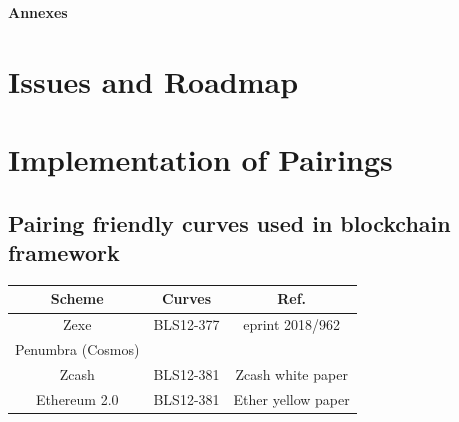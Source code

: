 \documentclass[11pt]{llncs2e/llncs}
\begin{document}
 
 
 
\appendix
\newpage
{\noindent\huge{\bf Annexes}}

\section{Issues and Roadmap}
 
 

\section{Implementation of Pairings}



\subsection{Pairing friendly curves used in blockchain framework}

\begin{table}[h!]
\begin{center}
 
\begin{tabular}{|c| c| c|}
\hline
 Scheme & Curves & Ref.\\
 \hline
 Zexe   & BLS12-377 & eprint 2018/962\\
 Penumbra (Cosmos) & &  \\
 \hline
 Zcash & BLS12-381 & Zcash white paper\\
 \hline
 Ethereum 2.0 & BLS12-381 & Ether yellow paper\\
 \hline
\end{tabular}
\end{center}
\end{table}
\end{document}
